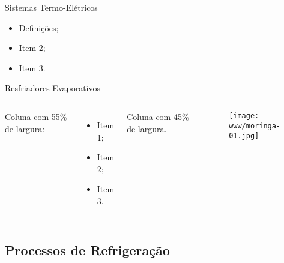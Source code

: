     \begin{frame}{Sistemas Termo-Elétricos}\vspace*{-0em}
        \begin{itemize}
            \item<1-> Definições;
            \item<1-> Item 2;
            \item<1-> Item 3.
        \end{itemize}
    \end{frame}

    \begin{frame}{Resfriadores Evaporativos}\vspace*{-0em}
        \begin{columns}
            Coluna com 55\% de largura:\\[\smallskipamount]
            \begin{itemize}
                \item<1-> Item 1;
                \item<2-> Item 2;
                \item<3-> Item 3.
            \end{itemize}
            Coluna com 45\% de largura.
            \begin{center}
                \begin{figure}
                    \texttt{[image: www/moringa-01.jpg]}
                \end{figure}
            \end{center}
        \end{columns}
    \end{frame}

\subsection{Processos de Refrigeração}


